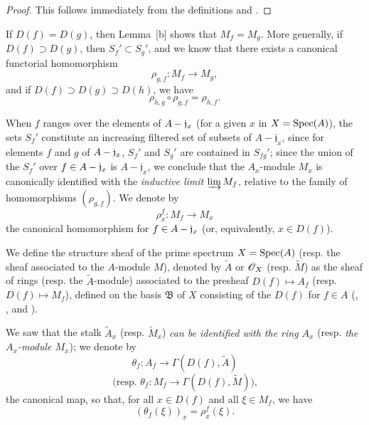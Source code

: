 \begin{proof}
\label{proof-1.1.3.2}
This follows immediately from the definitions and .
\end{proof}

\begin{env}[1.3.3]
\label{1.1.3.3}
If $D(f)=D(g)$, then Lemma~[b] shows that $M_f=M_g$.
More generally, if $D(f)\supset D(g)$, then $S_f'\subset S_g'$, and we know  that there exists a canonical functorial homomorphism
\[
  \rho_{g,f}:M_f\to M_g,
\]
and if $D(f)\supset D(g)\supset D(h)$, we have 
\[
  \rho_{h,g}\circ\rho_{g,f}=\rho_{h,f}.
  \tag{1.3.3.1}
\]
\end{env}

When $f$ ranges over the elements of $A-\mathfrak{j}_x$ (for a given $x$ in $X=\operatorname{Spec}(A)$), the sets $S_f'$ constitute an increasing filtered set of subsets of $A-\mathfrak{j}_x$, since for elements $f$ and $g$ of $A-\mathfrak{j}_x$, $S_f'$ and $S_g'$ are contained in $S_{fg}'$;
since the union of the $S_f'$ over $f\in A-\mathfrak{j}_x$ is $A-\mathfrak{j}_x$, we conclude  that the $A_x$-module $M_x$ is canonically identified with the \emph{inductive limit} $\varinjlim M_f$, relative to the family of homomorphisms $(\rho_{g,f})$.
We denote by
\[
  \rho_x^f:M_f\to M_x
\]
the canonical homomorphism for $f\in A-\mathfrak{j}_x$ (or, equivalently, $x\in D(f)$).

\begin{definition}[1.3.4]
\label{1.1.3.4}
We define the structure sheaf of the prime spectrum $X=\operatorname{Spec}(A)$ (resp. the sheaf associated to the $A$-module $M$), denoted by $\widetilde{A}$ or $\mathscr{O}_X$ (resp. $\widetilde{M}$) as the sheaf of rings (resp. the $\widetilde{A}$-module) associated to the presheaf $D(f)\mapsto A_f$ (resp. $D(f)\mapsto M_f$), defined on the basis $\mathfrak{B}$ of $X$ consisting of the $D(f)$ for $f\in A$ (, , and ).
\end{definition}

We saw  that the stalk $\widetilde{A}_x$ (resp. $\widetilde{M}_x$) \emph{can be identified with the ring $A_x$} (resp. \emph{the $A_x$-module $M_x$});
we denote by
\[
  \theta_f:A_f\to\Gamma(D(f),\widetilde{A})
\]
\[
  \text{(resp. }\theta_f:M_f\to\Gamma(D(f),\widetilde{M})\text{),}
\]
the canonical map, so that, for all $x\in D(f)$ and all $\xi\in M_f$, we have
\[
  (\theta_f(\xi))_x=\rho_x^f(\xi).
  \tag{1.3.4.1}
\]

